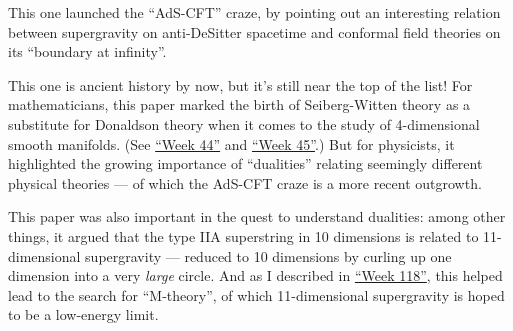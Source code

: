 \documentclass{article}
\def\tightlist{}
\renewcommand{\texttt}[1]{%
  \begingroup
  \ttfamily
  \begingroup\lccode`~=`/\lowercase{\endgroup\def~}{/\discretionary{}{}{}}%
  \begingroup\lccode`~=`[\lowercase{\endgroup\def~}{[\discretionary{}{}{}}%
  \begingroup\lccode`~=`.\lowercase{\endgroup\def~}{.\discretionary{}{}{}}%
  \catcode`/=\active\catcode`[=\active\catcode`.=\active
  \scantokens{#1\noexpand}%
  \endgroup
}
\begin{document}

This one launched the ``AdS-CFT'' craze, by pointing out an interesting
relation between supergravity on anti-DeSitter spacetime and conformal
field theories on its ``boundary at infinity''.


This one is ancient history by now, but it's still near the top of the
list! For mathematicians, this paper marked the birth of Seiberg-Witten
theory as a substitute for Donaldson theory when it comes to the study
of 4-dimensional smooth manifolds. (See
\protect\hyperlink{week44}{``Week 44''} and
\protect\hyperlink{week45}{``Week 45''}.) But for physicists, it
highlighted the growing importance of ``dualities'' relating seemingly
different physical theories --- of which the AdS-CFT craze is a more
recent outgrowth.


This paper was also important in the quest to understand dualities:
among other things, it argued that the type IIA superstring in 10
dimensions is related to 11-dimensional supergravity --- reduced to 10
dimensions by curling up one dimension into a very \emph{large} circle.
And as I described in \protect\hyperlink{week118}{``Week 118''}, this
helped lead to the search for ``M-theory'', of which 11-dimensional
supergravity is hoped to be a low-energy limit.
\end{document}
